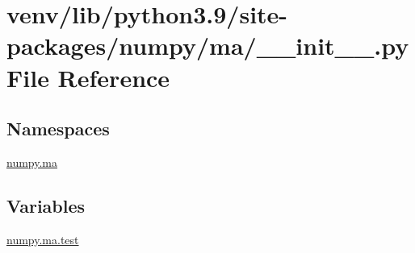 \hypertarget{venv_2lib_2python3_89_2site-packages_2numpy_2ma_2____init_____8py}{}\section{venv/lib/python3.9/site-\/packages/numpy/ma/\+\_\+\+\_\+init\+\_\+\+\_\+.py File Reference}
\label{venv_2lib_2python3_89_2site-packages_2numpy_2ma_2____init_____8py}
\subsection*{Namespaces}
\begin{DoxyCompactItemize}
\item 
 \hyperlink{namespacenumpy_1_1ma}{numpy.\+ma}
\end{DoxyCompactItemize}
\subsection*{Variables}
\begin{DoxyCompactItemize}
\item 
\hyperlink{namespacenumpy_1_1ma_a69031d1783dd0a4d2ce67e6c000ac1ee}{numpy.\+ma.\+test}
\end{DoxyCompactItemize}
